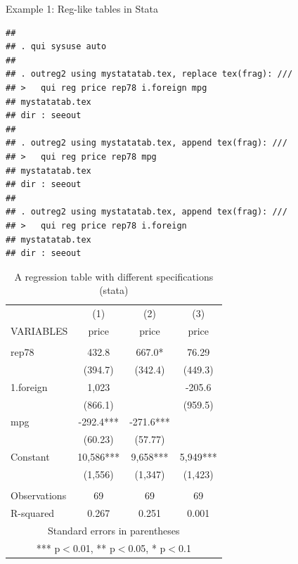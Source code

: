 \begin{frame}[fragile]{Example 1: Reg-like tables in Stata}

\footnotesize

\begin{verbatim}
## 
## . qui sysuse auto
## 
## . outreg2 using mystatatab.tex, replace tex(frag): ///
## >   qui reg price rep78 i.foreign mpg
## mystatatab.tex
## dir : seeout
## 
## . outreg2 using mystatatab.tex, append tex(frag): ///
## >   qui reg price rep78 mpg
## mystatatab.tex
## dir : seeout
## 
## . outreg2 using mystatatab.tex, append tex(frag): ///
## >   qui reg price rep78 i.foreign
## mystatatab.tex
## dir : seeout
\end{verbatim}

\end{frame}

\begin{frame}

\footnotesize

\begin{table}
\centering
\begin{tabular}{lccc} \hline  & (1) & (2) & (3) \\ VARIABLES & price & price & price \\ \hline  &  &  &  \\ rep78 & 432.8 & 667.0* & 76.29 \\  & (394.7) & (342.4) & (449.3) \\ 1.foreign & 1,023 &  & -205.6 \\  & (866.1) &  & (959.5) \\ mpg & -292.4*** & -271.6*** &  \\  & (60.23) & (57.77) &  \\ Constant & 10,586*** & 9,658*** & 5,949*** \\  & (1,556) & (1,347) & (1,423) \\  &  &  &  \\ Observations & 69 & 69 & 69 \\  R-squared & 0.267 & 0.251 & 0.001 \\ \hline \multicolumn{4}{c}{ Standard errors in parentheses} \\ \multicolumn{4}{c}{ *** p$<$0.01, ** p$<$0.05, * p$<$0.1} \\ \end{tabular}
\caption{A regression table with different specifications (stata)}
\end{table}

\end{frame}

